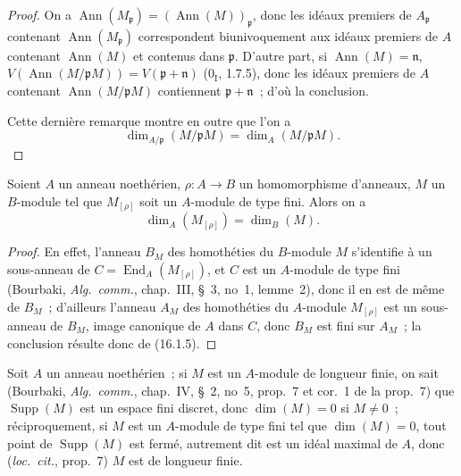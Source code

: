 \begin{proof}
On a
$\operatorname{Ann}(M_{\mathfrak{p}})=(\operatorname{Ann}(M))_{\mathfrak{p}}$,
donc les idéaux premiers de $A_{\mathfrak{p}}$ contenant
$\operatorname{Ann}(M_{\mathfrak{p}})$ correspondent biunivoquement aux
idéaux premiers de $A$ contenant $\operatorname{Ann}(M)$ et contenus dans
$\mathfrak{p}$. D'autre part, si $\operatorname{Ann}(M)=\mathfrak{n}$,
$V(\operatorname{Ann}(M/\mathfrak{p}M))=V(\mathfrak{p}+\mathfrak{n})$
($0_{\mathrm I}$, 1.7.5), donc les idéaux premiers de $A$ contenant
$\operatorname{Ann}(M/\mathfrak{p}M)$ contiennent
$\mathfrak{p}+\mathfrak{n}$~; d'où la conclusion.

Cette dernière remarque montre en outre que l'on a
\[
\label{0.16.1.8.2-fr}
  \dim_{A/\mathfrak{p}}(M/\mathfrak{p}M)=\dim_A(M/\mathfrak{p}M).
\tag{16.1.8.2}
\]
\end{proof}

\begin{proposition}[16.1.9]
\label{0.16.1.9-fr}
Soient $A$ un anneau noethérien, $\rho:A\to B$ un homomorphisme d'anneaux,
$M$ un $B$-module tel que $M_{[\rho]}$ soit un $A$-module de type fini. Alors
on a
\[
\label{0.16.1.9.1-fr}
  \dim_A(M_{[\rho]})=\dim_B(M).
\tag{16.1.9.1}
\]
\end{proposition}

\begin{proof}
En effet, l'anneau $B_M$ des homothéties du $B$-module $M$ s'identifie à un
sous-anneau de $C=\operatorname{End}_A(M_{[\rho]})$, et $C$ est un $A$-module
de type fini (Bourbaki, \emph{Alg.~comm.}, chap.~III, \S~3, no~1, lemme~2),
donc il en est de même de $B_M$~; d'ailleurs l'anneau $A_M$ des homothéties du
$A$-module $M_{[\rho]}$ est un sous-anneau de $B_M$, image canonique de $A$
dans $C$, donc $B_M$ est fini sur $A_M$~; la conclusion résulte donc de
(16.1.5).
\end{proof}

\begin{env}[16.1.10]
\label{0.16.1.10-fr}
Soit $A$ un anneau noethérien~; si $M$ est un $A$-module de longueur finie, on
sait (Bourbaki, \emph{Alg.~comm.}, chap.~IV, \S~2, no~5, prop.~7 et cor.~1 de
la prop.~7) que $\operatorname{Supp}(M)$ est un espace fini discret, donc
$\dim(M)=0$ si $M\neq0$~; réciproquement, si $M$ est un $A$-module de type
fini tel que $\dim(M)=0$, tout point de $\operatorname{Supp}(M)$ est fermé,
autrement dit est un idéal maximal de $A$, donc (\emph{loc.~cit.}, prop.~7)
$M$ est de longueur finie.
\end{env}

